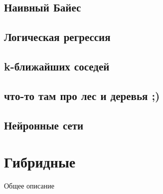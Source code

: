 \subsection{Наивный Байес}

\subsection{Логическая регрессия}

\subsection{k-ближайших соседей}

\subsection{что-то там про лес и деревья ;)}

\subsection{Нейронные сети}

\section{Гибридные}

Общее описание
